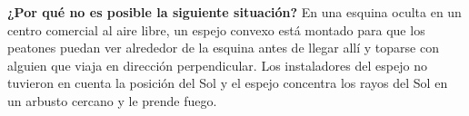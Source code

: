 \item \textbf{¿Por qué no es posible la siguiente situación?}
En una esquina oculta en un centro comercial al aire libre, un espejo convexo está montado para que los peatones puedan ver alrededor de la esquina antes de llegar allí y toparse con alguien que viaja en dirección perpendicular. Los instaladores del espejo no tuvieron en cuenta la posición del Sol y el espejo concentra los rayos del Sol en un arbusto cercano y le prende fuego.